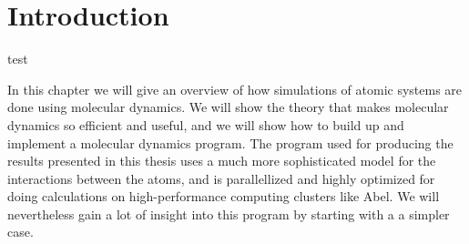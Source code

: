 \chapter{Introduction}
{\selectfont test}

In this chapter we will give an overview of how simulations of atomic systems are done using molecular dynamics. We will show the theory that makes molecular dynamics so efficient and useful, and we will show how to build up and implement a molecular dynamics program. The program used for producing the results presented in this thesis uses a much more sophisticated model for the interactions between the atoms, and is parallellized and highly optimized for doing calculations on high-performance computing clusters like Abel. We will nevertheless gain a lot of insight into this program by starting with a a simpler case.

% 
% 
% 
% 

